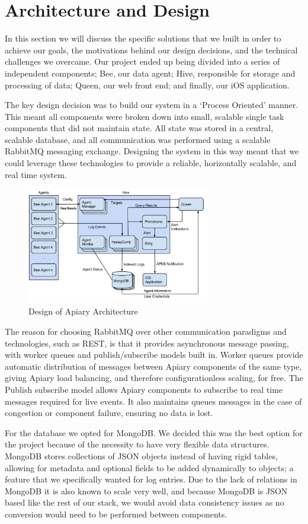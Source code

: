 \section{Architecture and Design}
In this section we will discuss the specific solutions that we built in order to
achieve our goals, the motivations behind our design decisions, and the
technical challenges we overcame. Our project ended up being divided into a
series of independent components; Bee, our data agent; Hive, responsible for
storage and processing of data; Queen, our web front end; and finally, our iOS
application.

The key design decision was to build our system in a ‘Process Oriented’ manner.
This meant all components were broken down into small, scalable single task
components that did not maintain state. All state was stored in a central,
scalable database, and all communication was performed using a scalable
RabbitMQ\cite{rabbit} messaging exchange. Designing the system in this way meant
that we could leverage these technologies to provide a reliable, horizontally
scalable, and real time system.

\graphicspath{{./pics/}}
\begin{figure}[h!]
  \includegraphics[width=8cm, keepaspectratio]{design.jpg}
  \caption{Design of Apiary Architecture}
\end{figure}


The reason for choosing RabbitMQ over other communication paradigms and
technologies, such as REST, is that it provides asynchronous message passing,
with worker queues and publish/subscribe models built in. Worker queues provide
automatic distribution of messages between Apiary components of the same type,
giving Apiary load balancing, and therefore configurationless scaling, for free.
The Publish subscribe model allows Apiary components to subscribe to real time
messages required for live events. It also maintains queues messages in the case
of congestion or component failure, ensuring no data is lost.

For the database we opted for MongoDB\cite{mongo}. We decided this was the best option
for the project because of the necessity to have very flexible data structures.
MongoDB stores collections of JSON objects instead of having rigid tables,
allowing for metadata and optional fields to be added dynamically to objects;
a feature that we specifically wanted for log entries. Due to the lack of
relations in MongoDB it is also known to scale very well, and because MongoDB
is JSON based like the rest of our stack, we would avoid data consistency
issues as no conversion would need to be performed between components.
